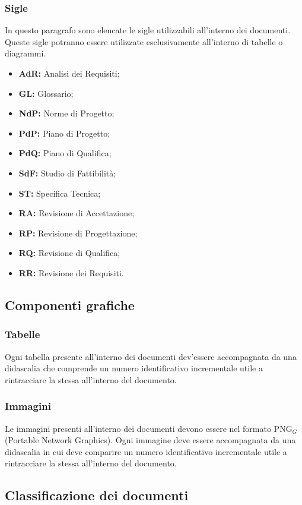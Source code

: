 \subsubsection{Sigle}
In questo paragrafo sono elencate le sigle utilizzabili all'interno dei documenti. Queste sigle potranno essere utilizzate esclusivamente all'interno di tabelle o diagrammi.
\begin{itemize}
\item \textbf{AdR:} Analisi dei Requisiti;
\item \textbf{GL:} Glossario;
\item \textbf{NdP:} Norme di Progetto;
\item \textbf{PdP:} Piano di Progetto;
\item \textbf{PdQ:} Piano di Qualifica;
\item \textbf{SdF:} Studio di Fattibilità;
\item \textbf{ST:} Specifica Tecnica;
\item \textbf{RA:} Revisione di Accettazione;
\item \textbf{RP:} Revisione di Progettazione;
\item \textbf{RQ:} Revisione di Qualifica;
\item \textbf{RR:} Revisione dei Requisiti.
\end{itemize}

\subsection{Componenti grafiche}
\subsubsection{Tabelle}
Ogni tabella presente all’interno dei documenti dev’essere accompagnata da una didascalia che comprende un numero identificativo incrementale utile a rintracciare la stessa all’interno del documento.

\subsubsection{Immagini}
Le immagini presenti all'interno dei documenti devono essere nel formato PNG$_G$ (Portable Network Graphics). Ogni immagine deve essere accompagnata da una didascalia in cui deve comparire un numero identificativo incrementale utile a rintracciare la stessa all’interno del documento.

\subsection{Classificazione dei documenti}
